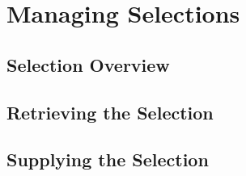 \chapter{Managing Selections}
\section{Selection Overview}
\section{Retrieving the Selection}
\section{Supplying the Selection}

